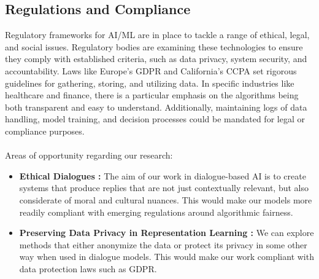 \documentclass[11pt]{article}
\begin{document}
\subsection{Regulations and Compliance}
Regulatory frameworks for AI/ML are in place to tackle a range of ethical, legal, and social issues. Regulatory bodies are examining these technologies to ensure they comply with established criteria, such as data privacy, system security, and accountability. Laws like Europe's GDPR and California's CCPA set rigorous guidelines for gathering, storing, and utilizing data. In specific industries like healthcare and finance, there is a particular emphasis on the algorithms being both transparent and easy to understand. Additionally, maintaining logs of data handling, model training, and decision processes could be mandated for legal or compliance purposes.\\\\
Areas of opportunity regarding our research:
\begin{itemize}
    \item \textbf{Ethical Dialogues \cite{Sun2022MoralDialAF}:} The aim of our work in dialogue-based AI is to create systems that produce replies that are not just contextually relevant, but also considerate of moral and cultural nuances. This would make our models more readily compliant with emerging regulations around algorithmic fairness.
    \item \textbf{Preserving Data Privacy in Representation Learning \cite{Carlini2020ExtractingTD}:} We can explore methods that either anonymize the data or protect its privacy in some other way when used in dialogue models. This would make our work compliant with data protection laws such as GDPR.
\end{itemize}




\end{document}
